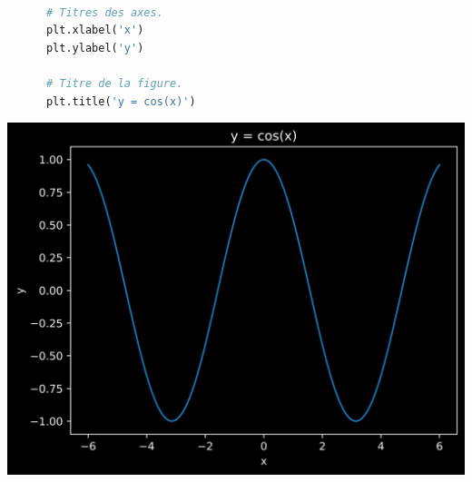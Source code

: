 \documentclass[aspectratio=169]{beamer}
\begin{document}
\begin{frame}[fragile]{}{}
  \vfill
  \begin{minipage}{.48\textwidth}
    \begin{lstlisting}[language=Python]

      # Titres des axes.
      plt.xlabel('x')
      plt.ylabel('y')

      # Titre de la figure.
      plt.title('y = cos(x)')
    \end{lstlisting}
  \end{minipage}%
  \hfill
  \begin{minipage}{.48\textwidth}
    \centering
    \includegraphics[width=\textwidth]{line_plot_labels}
  \end{minipage}
  \vfill
\end{frame}
\end{document}
